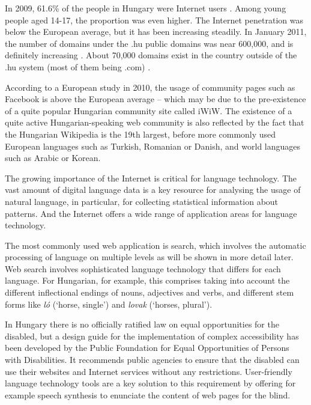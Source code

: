\begin{multicols}{2}
  In 2009, 61.6\% of the people in Hungary were Internet users \cite{internet}. Among young people aged 14-17, the proportion was even higher. The Internet penetration was below the European average, but it has been increasing steadily. In January 2011, the number of domains under the .hu public domains was near 600,000, and is definitely increasing \cite{domain}. About 70,000 domains exist in the country outside of the .hu system (most of them being .com) \cite{com}.


  According to a European study in 2010, the usage of community pages such as Facebook is above the European average -- which may be due to the pre-existence of a quite popular Hungarian community site called iWiW. The existence of a quite active Hungarian-speaking web community is also reflected by the fact that the Hungarian Wikipedia is the 19th largest, before more commonly used European languages such as Turkish, Romanian or Danish, and world languages such as Arabic or Korean.

  The growing importance of the Internet is critical for language technology. The vast amount of digital language data is a key resource for analysing the usage of natural language, in particular, for collecting statistical information about patterns. And the Internet offers a wide range of application areas for language technology. 

  The most commonly used web application is search, which involves the automatic processing of language on multiple levels as will be shown in more detail later. Web search involves sophisticated language technology that differs for each language. For Hungarian, for example, this comprises taking into account the different inflectional endings of nouns, adjectives and verbs, and different stem forms like \textit{ló} (`horse, single') and \textit{lovak} (`horses, plural'). 

  In Hungary there is no officially ratified law on equal opportunities for the disabled, but a design guide for the implementation of complex accessibility has been developed by the Public Foundation for Equal Opportunities of Persons with Disabilities. It recommends public agencies to ensure that the disabled can use their websites and Internet services without any restrictions. User-friendly language technology tools are a key solution to this requirement by offering for example speech synthesis to enunciate the content of web pages for the blind.


\end{multicols}

